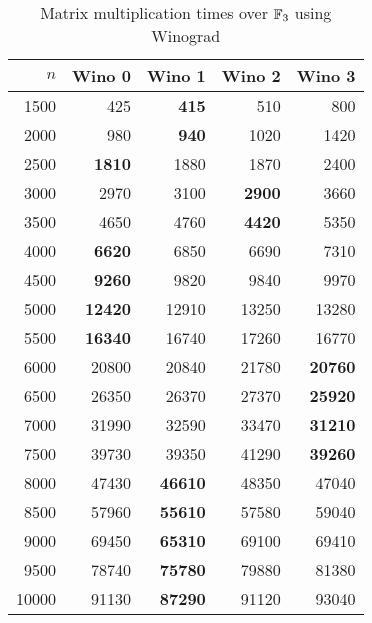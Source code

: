 \begin{table}[ht]
\begin{center}
\begin{tabular}{|r||r|r|r|r|}
\hline
$n$ & Wino 0 & Wino 1 & Wino 2 & Wino 3 \\
\hline
1500 & 425 & \textbf{415} & 510 & 800\\
2000 & 980 & \textbf{940} & 1020 & 1420\\
2500 & \textbf{1810} & 1880 & 1870 & 2400\\
3000 & 2970 & 3100 & \textbf{2900} & 3660\\
3500 & 4650 & 4760 & \textbf{4420} & 5350\\
4000 & \textbf{6620} & 6850 & 6690 & 7310\\
4500 & \textbf{9260} & 9820 & 9840 & 9970\\
5000 & \textbf{12420} & 12910 & 13250 & 13280\\
5500 & \textbf{16340} & 16740 & 17260 & 16770\\
6000 & 20800 & 20840 & 21780 & \textbf{20760}\\
6500 & 26350 & 26370 & 27370 & \textbf{25920}\\
7000 & 31990 & 32590 & 33470 & \textbf{31210}\\
7500 & 39730 & 39350 & 41290 & \textbf{39260}\\
8000 & 47430 & \textbf{46610} & 48350 & 47040\\
8500 & 57960 & \textbf{55610} & 57580 & 59040\\
9000 & 69450 & \textbf{65310} & 69100 & 69410\\
9500 & 78740 & \textbf{75780} & 79880 & 81380\\
10000 & 91130 & \textbf{87290} & 91120 & 93040\\
\hline
\end{tabular}
\end{center}
\caption{Matrix multiplication times over $\mathbb{F}_3$ using Winograd}
\label{MatMulWinograd3}
\end{table}

